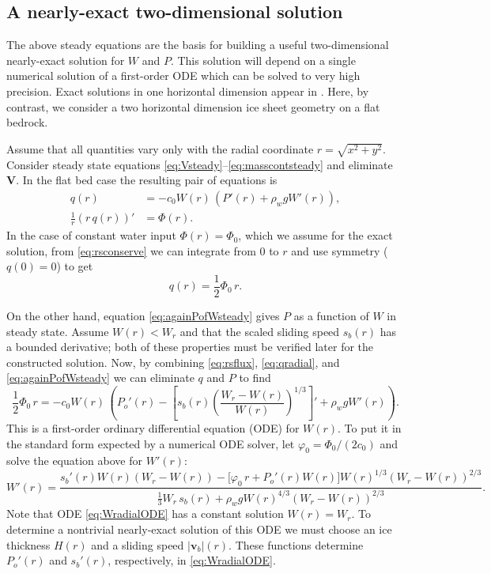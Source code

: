\documentclass[11pt,final]{amsart}%
\newcommand\bv{\mathbf{v}}
\newcommand\bV{\mathbf{V}}
\begin{document}
\subsection*{A nearly-exact two-dimensional solution}  The above steady equations are the basis for building a useful two-dimensional nearly-exact solution for $W$ and $P$.  This solution will depend on a single numerical solution of a first-order ODE which can be solved to very high precision.  Exact solutions in one horizontal dimension appear in \cite{Schoofetal2012}.  Here, by contrast, we consider a two horizontal dimension ice sheet geometry on a flat bedrock.

Assume that all quantities vary only with the radial coordinate $r = \sqrt{x^2+y^2}$.  Consider steady state equations \eqref{eq:Vsteady}--\eqref{eq:masscontsteady} and eliminate $\bV$.  In the flat bed case the resulting pair of equations is
\begin{align}
q(r) &= - c_0 W(r)\, \left(P'(r) + \rho_w g W'(r)\right), \label{eq:rsflux} \\
\frac{1}{r}\left(r\,q(r)\right)' &= \Phi(r). \label{eq:rsconserve}
\end{align}
In the case of constant water input $\Phi(r)=\Phi_0$, which we assume for the exact solution, from \eqref{eq:rsconserve} we can integrate from $0$ to $r$ and use symmetry ($q(0)=0$) to get
\begin{equation}
q(r) = \frac{1}{2} \Phi_0\, r. \label{eq:qradial}
\end{equation}

On the other hand, equation \eqref{eq:againPofWsteady} gives $P$ as a function of $W$ in steady state.  Assume $W(r) < W_r$ and that the scaled sliding speed $s_b(r)$ has a bounded derivative; both of these properties must be verified later for the constructed solution.  Now, by combining \eqref{eq:rsflux}, \eqref{eq:qradial}, and \eqref{eq:againPofWsteady} we can eliminate $q$ and $P$ to find
	$$\frac{1}{2} \Phi_0\, r = - c_0 W(r)\, \left(P_o'(r) - \left[s_b(r) \left(\frac{W_r - W(r)}{W(r)}\right)^{1/3}\right]' + \rho_w g W'(r)\right).$$
This is a first-order ordinary differential equation (ODE) for $W(r)$.  To put it in the standard form expected by a numerical ODE solver, let $\varphi_0 = \Phi_0 / (2 c_0)$ and solve the equation above for $W'(r)$:
\begin{equation}
W'(r) = \frac{s_b'(r) W(r) \left(W_r - W(r)\right) - \Big[\varphi_0\, r + P_o'(r) W(r)\Big] W(r)^{1/3} \left(W_r - W(r)\right)^{2/3}}{\frac{1}{3} W_r\, s_b(r) + \rho_w g W(r)^{4/3} \left(W_r - W(r)\right)^{2/3}}.
\label{eq:WradialODE}
\end{equation}
Note that ODE \eqref{eq:WradialODE} has a constant solution $W(r)=W_r$.  To determine a nontrivial nearly-exact solution of this ODE we must choose an ice thickness $H(r)$ and a sliding speed $|\bv_b|(r)$.  These functions determine $P_o'(r)$ and $s_b'(r)$, respectively, in \eqref{eq:WradialODE}.  
\end{document}
